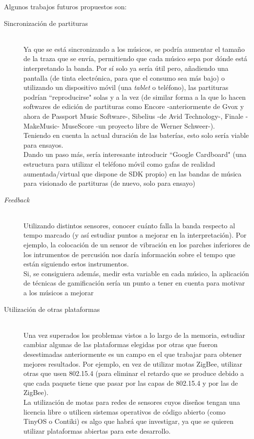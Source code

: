 Algunos trabajos futuros propuestos son:
\begin{description}
    \item[Sincronización de partituras] \hfill \\
      Ya que se está sincronizando a los músicos, se podría aumentar el tamaño de la traza
      que se envía, permitiendo que cada músico sepa por dónde está interpretando la banda.
      Por sí solo ya sería útil pero, añadiendo una pantalla (de tinta electrónica, para que el consumo
      sea más bajo) o utilizando un dispositivo móvil (una \textit{tablet} o teléfono), las partituras
      podrían ``reproducirse" solas y a la vez (de similar forma a la que lo hacen softwares de edición
      de partituras como Encore -anteriormente de Gvox y ahora de Passport Music Software-, Sibelius -de Avid Technology-,
      Finale -MakeMusic- MuseScore -un proyecto libre de Werner Schweer-).\\
      Teniendo en cuenta la actual duración de las baterías, esto solo sería viable para ensayos.\\
      Dando un paso más, sería interesante introducir ``Google Cardboard" \cite{cardboard} (una estructura
      para utilizar el teléfono móvil como gafas de realidad aumentada/virtual que dispone de SDK propio)
      en las bandas de música para visionado de partituras (de nuevo, solo para ensayo)

    \item[\textit{Feedback}] \hfill \\
      Utilizando distintos sensores, conocer cuánto falla la banda respecto al tempo marcado (y así estudiar
      puntos a mejorar en la interpretación). Por ejemplo, la colocación de un sensor de vibración
      en los parches inferiores de los intrumentos de percusión nos daría información sobre el tempo que están
      siguiendo estos instrumentos.\\
      Si, se consiguiera además, medir esta variable en cada músico, la aplicación de técnicas de gamificación
      sería un punto a tener en cuenta para motivar a los músicos a mejorar

    \item[Utilización de otras plataformas] \hfill \\
      Una vez superados los problemas vistos a lo largo de la memoria, estudiar cambiar algunas de las plataformas
      elegidas por otras que fueron desestimadas anteriormente es un campo en el que trabajar para obtener mejores
      resultados. Por ejemplo, en vez de utilizar motas ZigBee, utilizar otras que usen 802.15.4 (para eliminar
      el retardo que se produce debido a que cada paquete tiene que pasar por las capas de 802.15.4 y por las de ZigBee).\\
      La utilización de motas para redes de sensores cuyos diseños tengan una licencia libre o utilicen sistemas
      operativos de código abierto (como TinyOS o Contiki) es algo que habrá que investigar, ya que se quieren
      utilizar plataformas abiertas para este desarrollo.


\end{description}
